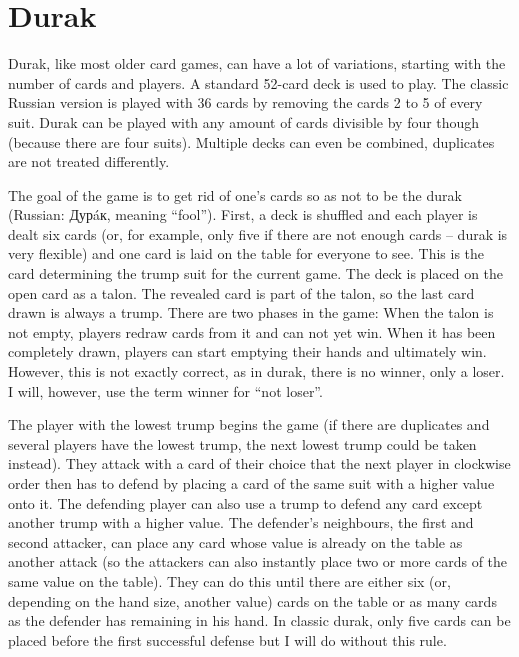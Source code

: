 \documentclass[a4paper,titlepage]{article}
\begin{document}
\section{Durak}

Durak, like most older card games, can have a lot of variations, starting with the number of cards and players. A standard 52-card deck is used to play. The classic Russian version is played with 36 cards by removing the cards 2 to 5 of every suit. Durak can be played with any amount of cards divisible by four though (because there are four suits). Multiple decks can even be combined, duplicates are not treated differently.

The goal of the game is to get rid of one's cards so as not to be the durak (Russian: Дурáк, meaning ``fool''). First, a deck is shuffled and each player is dealt six cards (or, for example, only five if there are not enough cards -- durak is very flexible) and one card is laid on the table for everyone to see. This is the card determining the trump suit for the current game. The deck is placed on the open card as a talon. The revealed card is part of the talon, so the last card drawn is always a trump.
There are two phases in the game: When the talon is not empty, players redraw cards from it and can not yet win. When it has been completely drawn, players can start emptying their hands and ultimately win. However, this is not exactly correct, as in durak, there is no winner, only a loser. I will, however, use the term winner for ``not loser''. \medskip

The player with the lowest trump begins the game (if there are duplicates and several players have the lowest trump, the next lowest trump could be taken instead). They attack with a card of their choice that the next player in clockwise order then has to defend by placing a card of the same suit with a higher value onto it. The defending player can also use a trump to defend any card except another trump with a higher value. The defender's neighbours, the first and second attacker, can place any card whose value is already on the table as another attack (so the attackers can also instantly place two or more cards of the same value on the table). They can do this until there are either six (or, depending on the hand size, another value) cards on the table or as many cards as the defender has remaining in his hand. In classic durak, only five cards can be placed before the first successful defense but I will do without this rule.
\end{document}
